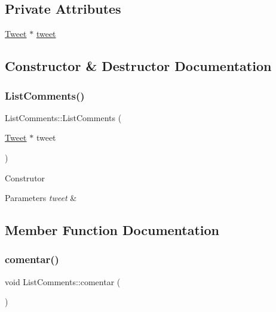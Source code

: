 \subsection*{Private Attributes}
\begin{DoxyCompactItemize}
\item 
\hyperlink{class_tweet}{Tweet} $\ast$ \hyperlink{class_list_comments_a415809885eccf4beabda6a346a797d7c}{tweet}
\end{DoxyCompactItemize}


\subsection{Constructor \& Destructor Documentation}
\mbox{\label{class_list_comments_a5d9da26fbb0dc3eb6cee9ff129b28e27}} 
\subsubsection{\texorpdfstring{List\+Comments()}{ListComments()}}
{\footnotesize\ttfamily List\+Comments\+::\+List\+Comments (\begin{DoxyParamCaption}\item[{\hyperlink{class_tweet}{Tweet} $\ast$}]{tweet }\end{DoxyParamCaption})}

Construtor 
\begin{DoxyParams}{Parameters}
{\em tweet} & \\
\hline
\end{DoxyParams}


\subsection{Member Function Documentation}
\mbox{\label{class_list_comments_a43ac4c1f520ca659b45cbc83c2157c69}} 
\subsubsection{\texorpdfstring{comentar()}{comentar()}}
{\footnotesize\ttfamily void List\+Comments\+::comentar (\begin{DoxyParamCaption}{ }\end{DoxyParamCaption})\hspace{0.3cm}{\ttfamily [private]}}




